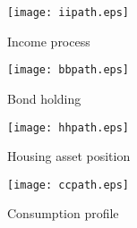 \documentclass[a4paper,10pt]{article}
\begin{document}
\begin{figure}[h!]
\begin{center}
		\texttt{[image: iipath.eps]}
		\caption{Income process}
\end{center}\end{figure}

\begin{figure}[!ht]
\begin{center}
		\texttt{[image: bbpath.eps]}
		\caption{Bond holding}
\end{center}\end{figure}

\begin{figure}[!ht]
\begin{center}
		\texttt{[image: hhpath.eps]}
		\caption{Housing asset position}
\end{center}\end{figure}

\begin{figure}[!ht]
\begin{center}
		\texttt{[image: ccpath.eps]}
		\caption{Consumption profile}
\end{center}\end{figure}
\end{document}
